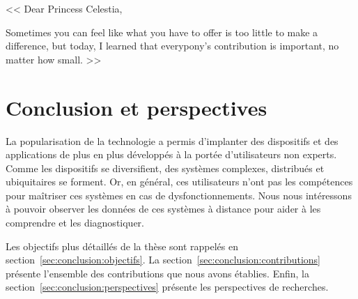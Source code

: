 \begin{savequote}[.5\textwidth]
<< Dear Princess Celestia,

\quad Sometimes you can feel like what you have to offer is too little to make a difference, but today, I learned that everypony's contribution is important, no matter how small. >>
\end{savequote}

\chapter{Conclusion et perspectives}\label{chap:conclusion}
\chaptertoc
La popularisation de la technologie a permis d'implanter des dispositifs et des applications de plus en plus développés à la portée d'utilisateurs non experts. Comme les dispositifs se diversifient, des systèmes complexes, distribués et ubiquitaires se forment. Or, en général, ces utilisateurs n'ont pas les compétences pour maîtriser ces systèmes en cas de dysfonctionnements. Nous nous intéressons à pouvoir observer les données de ces systèmes à distance pour aider à les comprendre et les diagnostiquer.

Les objectifs plus détaillés de la thèse sont rappelés en section~\ref{sec:conclusion:objectifs}. La section~\ref{sec:conclusion:contributions} présente l'ensemble des contributions que nous avons établies. Enfin, la section~\ref{sec:conclusion:perspectives} présente les perspectives de recherches.




